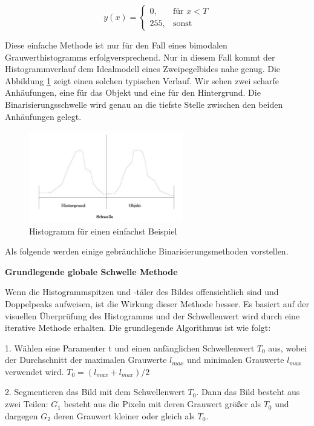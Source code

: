 \begin{equation}
  y(x) =
  \begin{cases} 
  0,   & \mbox{für }x < T \\
  255, & \mbox{sonst}
  \end{cases}
\end{equation}




Diese einfache Methode ist nur für den Fall eines bimodalen Grauwerthistogramms erfolgversprechend. Nur in diesem Fall kommt der Histogrammverlauf dem Idealmodell eines Zweipegelbides nahe genug.
Die Abbildung \ref{fig:Histogramm} zeigt einen solchen typischen Verlauf. Wir sehen zwei scharfe Anhäufungen, eine für das Objekt und eine für den Hintergrund. Die Binarisierungsschwelle wird genau an die tiefste Stelle zwischen den beiden Anhäufungen gelegt.

\begin{figure}[htb]
 \centering 
  \includegraphics[keepaspectratio,width=0.6\textwidth]{images/4_ZweiteErfahrung/Binar/binar.pdf}
 \caption{Histogramm für einen einfachst Beispiel}
 \label{fig:Histogramm}
\end{figure} 

Als folgende werden einige gebräuchliche Binarisierungsmethoden vorstellen.

\textbf{Grundlegende globale Schwelle Methode}

Wenn die Histogrammspitzen und -täler des Bildes offensichtlich sind und Doppelpeaks aufweisen, ist die Wirkung dieser Methode besser. Es basiert auf der visuellen Überprüfung des Histogramms und der Schwellenwert wird durch eine iterative Methode erhalten. Die grundlegende Algorithmus ist wie folgt:

1. Wählen eine Paramenter t und einen anfänglichen Schwellenwert $ T_{0} $ aus, wobei der Durchschnitt der maximalen Grauwerte $ l_{max} $ und minimalen Grauwerte  $ l_{max} $ verwendet wird. $ T_{0} = (l_{max}+l_{max})/2 $

2. Segmentieren das Bild mit dem Schwellenwert $ T_{0} $. Dann das Bild besteht aus zwei Teilen: $ G_{1} $ besteht aus die Pixeln mit deren Grauwert größer als $ T_{0} $ und dargegen $ G_{2} $ deren Grauwert kleiner oder gleich als $ T_{0} $.

